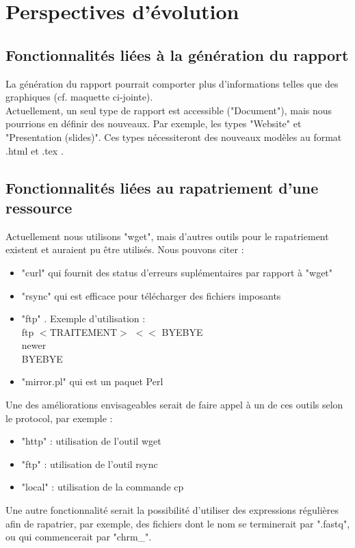 \documentclass[a4paper,11pt]{article}
\begin{document}
\section{Perspectives d'évolution}
	\subsection{Fonctionnalités liées à la génération du rapport}
		La génération du rapport pourrait comporter plus d'informations telles que des graphiques (cf. maquette ci-jointe). \\
		Actuellement, un seul type de rapport est accessible ("Document"), mais nous pourrions en définir des nouveaux. 
		Par exemple, les types "Website" et "Presentation (slides)". Ces types nécessiteront des nouveaux modèles au format .html et .tex .
		
	\subsection{Fonctionnalités liées au rapatriement d'une ressource}
		Actuellement nous utilisons "wget", mais d'autres outils pour le rapatriement existent et auraient pu être utilisés. Nous pouvons citer :
		\begin{itemize}
			\item "curl" qui fournit des status d'erreurs suplémentaires par rapport à "wget"
			\item "rsync" qui est efficace pour télécharger des fichiers imposants
			\item "ftp" . Exemple d'utilisation : \\ ftp $<$TRAITEMENT$>$ $<<$ BYEBYE \\ newer \\ BYEBYE
			\item "mirror.pl" qui est un paquet Perl
		\end{itemize}
		Une des améliorations envisageables serait de faire appel à un de ces outils selon le protocol, par exemple :
		\begin{itemize}
			\item "http" : utilisation de l'outil wget
			\item "ftp" : utilisation de l'outil rsync
			\item "local" : utilisation de la commande cp
		\end{itemize}
		Une autre fonctionnalité serait la possibilité d'utiliser des expressions régulières afin de rapatrier, par exemple, des fichiers dont le nom se terminerait par ".fastq", ou qui commencerait par "chrm\_".
\end{document}
